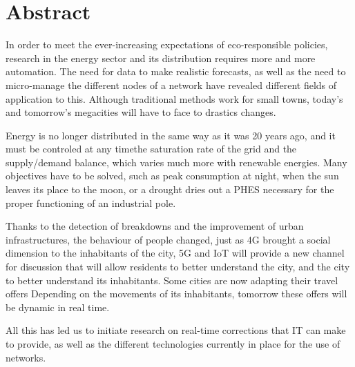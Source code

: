 \chapter*{Abstract}

In order to meet the ever-increasing expectations of eco-responsible policies,
research in the energy sector and its distribution requires more and more automation.
The need for data to make realistic forecasts, as well as the need to micro-manage the different nodes
of a network have revealed different fields of application to this. Although traditional methods work
for small towns, today's and tomorrow's megacities will have to face to drastics changes.

Energy is no longer distributed in the same way as it was 20 years ago, and it must
be controled at any timethe saturation rate of the grid and the supply/demand balance,
which varies much more with renewable energies.
Many objectives have to be solved, such as peak consumption at night, when the sun leaves its place
to the moon, or a drought dries out a PHES necessary for the proper functioning of an industrial pole.

Thanks to the detection of breakdowns and the improvement of urban infrastructures, the behaviour of people
changed, just as 4G brought a social dimension to the inhabitants of the city, 5G and IoT
will provide a new channel for discussion that will allow residents to better understand the city, and
the city to better understand its inhabitants. Some cities are now adapting their travel offers
Depending on the movements of its inhabitants, tomorrow these offers will be dynamic in real time.

All this has led us to initiate research on real-time corrections that IT can make
to provide, as well as the different technologies currently in place for the use of networks.
